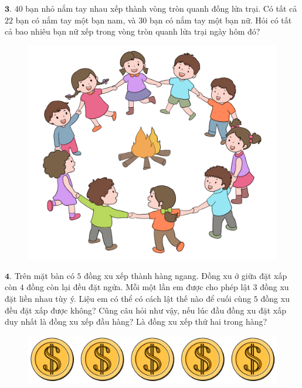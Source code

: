 \begin{multicols}{2}
\begin{figure}[H]
		\vspace*{-15pt}
	\end{figure}
	$\pmb{3.}$ $40$ bạn nhỏ nắm tay nhau xếp thành vòng tròn quanh đống lửa trại. Có tất cả $22$ bạn có nắm tay một bạn nam, và $30$ bạn có nắm tay một bạn nữ. Hỏi có tất cả bao nhiêu bạn nữ xếp trong vòng tròn quanh lửa trại ngày hôm đó?
	\begin{figure}[H]
		\centering
		\vspace*{-10pt}
		\captionsetup{labelformat= empty, justification=centering}
		\includegraphics[width=0.9\linewidth]{Pi12_Bai3}
		\vspace*{-10pt}
	\end{figure}
	$\pmb{4.}$ Trên mặt bàn có $5$ đồng xu xếp thành hàng ngang. Đồng xu ở giữa đặt xấp còn $4$ đồng còn lại đều đặt ngửa. Mỗi một lần em được cho phép lật $3$ đồng xu đặt liền nhau tùy ý. Liệu em có thể có cách lật thế nào để cuối cùng $5$ đồng xu đều đặt xấp được không?
	\vskip 0.1cm
	Cũng câu hỏi như vậy, nếu lúc đầu đồng xu đặt xấp duy nhất là đồng xu xếp đầu hàng? Là đồng xu xếp thứ hai trong hàng?
	\begin{figure}[H]
		\centering
		\vspace*{-5pt}
		\captionsetup{labelformat= empty, justification=centering}
		\includegraphics[width=1\linewidth]{Pi12_Bai4}

\end{figure}
\end{multicols}
